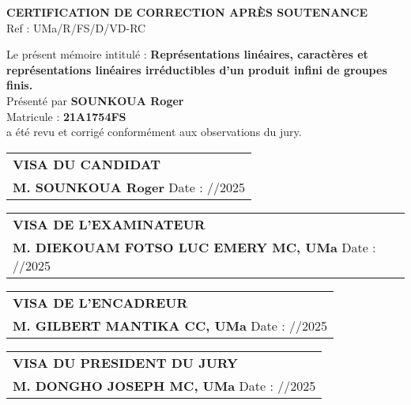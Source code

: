 \documentclass[11pt,a4paper]{article}
\begin{document}
\begin{center}
\vspace{1cm}
\Large\textbf{CERTIFICATION DE CORRECTION APRÈS SOUTENANCE} \\
\vspace{0.5cm}
Ref : \underline{\hspace{3cm}} UMa/R/FS/D/VD-RC \\
\end{center}

\vspace{0.75cm}
\noindent
Le présent mémoire intitulé : \small{\textbf{Représentations linéaires, caractères et représentations linéaires irréductibles d'un produit infini de groupes finis.}} \\
Présenté par \textbf{SOUNKOUA Roger} \\
Matricule : \textbf{21A1754FS} \\
a été revu et corrigé conformément aux observations du jury. \\

\vspace{1.5cm}

\begin{tabular}{@{}l@{}}
\textbf{VISA DU CANDIDAT} \\
\textbf{M. SOUNKOUA Roger}\hspace{5.25cm} Date : \underline{\hspace{1.5cm}}/\underline{\hspace{1.5cm}}/2025\\

\end{tabular}

\vspace{2.5cm}

\begin{tabular}{@{}l@{}}
\textbf{VISA DE L'EXAMINATEUR} \\
\textbf{M. DIEKOUAM FOTSO LUC EMERY MC, UMa}  \hspace{2.5cm} Date : \underline{\hspace{1.5cm}}/\underline{\hspace{1.5cm}}/2025  \\

\end{tabular}

\vspace{2.5cm}

\begin{tabular}{@{}l@{}}
\textbf{VISA DE L'ENCADREUR} \\
\textbf{M. GILBERT MANTIKA CC, UMa} \hspace{5.3cm} Date : \underline{\hspace{1.5cm}}/\underline{\hspace{1.5cm}}/2025\\

\end{tabular}

\vspace{2.5cm}

\begin{tabular}{@{}l@{}}
\textbf{VISA DU PRESIDENT DU JURY} \\
\textbf{M. DONGHO JOSEPH MC, UMa} \hspace{2.5cm} Date : \underline{\hspace{1.5cm}}/\underline{\hspace{1.5cm}}/2025\\

\end{tabular}
\end{document}
